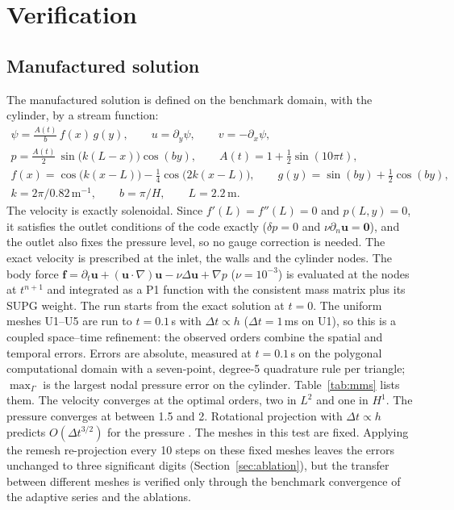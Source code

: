 \documentclass[preprint,12pt,number]{elsarticle}
\newcommand{\bu}{\mathbf{u}}
\newcommand{\dt}{\Delta t}
\begin{document}
\section{Verification}
\label{sec:verification}

\subsection{Manufactured solution}

The manufactured solution is defined on the benchmark domain, with the cylinder, by a stream
function:
\begin{gather*}
\psi = \frac{A(t)}{b}\, f(x)\, g(y),\qquad u = \partial_y\psi,\qquad v = -\partial_x\psi,\\
p = \frac{A(t)}{2}\,\sin\big(k(L - x)\big)\cos(by),\qquad A(t) = 1 + \tfrac12\sin(10\pi t),\\
f(x) = \cos\big(k(x - L)\big) - \tfrac14\cos\big(2k(x - L)\big),\qquad g(y) = \sin(by) + \tfrac12\cos(by),\\
k = 2\pi/0.82\,\mathrm{m^{-1}},\qquad b = \pi/H,\qquad L = 2.2\,\mathrm{m}.
\end{gather*}
The velocity is exactly solenoidal. Since $f'(L) = f''(L) = 0$ and $p(L, y) = 0$, it satisfies
the outlet conditions of the code exactly ($\delta p = 0$ and $\nu\partial_n\bu = \mathbf{0}$),
and the outlet also fixes the pressure level, so no gauge correction is needed. The exact
velocity is prescribed at the inlet, the walls and the cylinder nodes. The body force
$\mathbf{f} = \partial_t\bu + (\bu\cdot\nabla)\bu - \nu\Delta\bu + \nabla p$
($\nu = 10^{-3}$) is evaluated at the nodes at $t^{n+1}$ and integrated as a P1 function with the
consistent mass matrix plus its SUPG weight. The run starts from the exact solution at $t = 0$.
The uniform meshes U1--U5 are run to $t = 0.1\,$s with $\dt\propto h$ ($\dt = 1\,$ms on U1),
so this is a coupled space--time refinement: the observed orders combine the spatial and temporal
errors.
Errors are absolute, measured at $t = 0.1\,$s on the polygonal computational domain with a
seven-point, degree-5 quadrature rule per triangle; $\max_\Gamma$ is the largest nodal pressure
error on the cylinder. Table~\ref{tab:mms} lists them. The velocity converges at the optimal
orders, two in $L^2$ and one in $H^1$. The pressure converges at between 1.5 and 2. Rotational
projection with $\dt \propto h$ predicts $O(\dt^{3/2})$ for the pressure \citep{guermond2006}.
The meshes in this test are fixed. Applying the remesh re-projection every 10 steps on these
fixed meshes leaves the errors unchanged to three significant digits
(Section~\ref{sec:ablation}), but the transfer between different meshes is verified only
through the benchmark convergence of the adaptive series and the ablations.
\end{document}
